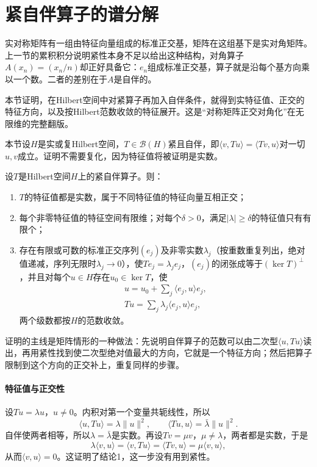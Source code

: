 \section{紧自伴算子的谱分解}
\label{sec:ospec-compact-self-adjoint}

实对称矩阵有一组由特征向量组成的标准正交基，矩阵在这组基下是实对角矩阵。上一节的累积积分说明紧性本身不足以给出这种结构，对角算子$A(x_n)=(x_n/n)$却正好具备它：$e_n$组成标准正交基，算子就是沿每个基方向乘以一个数。二者的差别在于$A$是自伴的。

本节证明，在Hilbert空间中对紧算子再加入自伴条件，就得到实特征值、正交的特征方向，以及按Hilbert范数收敛的特征展开。这是“对称矩阵正交对角化”在无限维的完整翻版。

本节设$H$是实或复Hilbert空间，$T\in\mathcal B(H)$紧且自伴，即$\langle v,Tu\rangle=\langle Tv,u\rangle$对一切$u,v$成立。证明不需要复化，因为特征值将被证明是实数。

\begin{theorem}[紧自伴算子的谱分解]
\label{thm:ospec-compact-self-adjoint}
设$T$是Hilbert空间$H$上的紧自伴算子。则：
\begin{enumerate}
\item $T$的特征值都是实数，属于不同特征值的特征向量互相正交；
\item 每个非零特征值的特征空间有限维；对每个$\delta>0$，满足$\lvert\lambda\rvert\geq\delta$的特征值只有有限个；
\item 存在有限或可数的标准正交序列$(e_j)$及非零实数$\lambda_j$（按重数重复列出，绝对值递减，序列无限时$\lambda_j\to0$），使$Te_j=\lambda_je_j$，$(e_j)$的闭张成等于$(\ker T)^\perp$，并且对每个$u\in H$存在$u_0\in\ker T$，使
\begin{equation}
\begin{gathered}
u=u_0+\sum_j\langle e_j,u\rangle e_j,\\
Tu=\sum_j\lambda_j\langle e_j,u\rangle e_j,
\end{gathered}
\label{eq:ospec-spectral-expansion}
\end{equation}
两个级数都按$H$的范数收敛。
\end{enumerate}
\end{theorem}

证明的主线是矩阵情形的一种做法：先说明自伴算子的范数可以由二次型$\langle u,Tu\rangle$读出，再用紧性找到使二次型绝对值最大的方向，它就是一个特征方向；然后把算子限制到这个方向的正交补上，重复同样的步骤。

\paragraph{特征值与正交性}
设$Tu=\lambda u$，$u\neq0$。内积对第一个变量共轭线性，所以
\[
\langle u,Tu\rangle=\lambda\lVert u\rVert^2,\qquad\langle Tu,u\rangle=\bar\lambda\lVert u\rVert^2 .
\]
自伴使两者相等，所以$\lambda=\bar\lambda$是实数。再设$Tv=\mu v$，$\mu\neq\lambda$，两者都是实数，于是
\[
\lambda\langle v,u\rangle=\langle v,Tu\rangle=\langle Tv,u\rangle=\mu\langle v,u\rangle,
\]
从而$\langle v,u\rangle=0$。这证明了结论1，这一步没有用到紧性。

